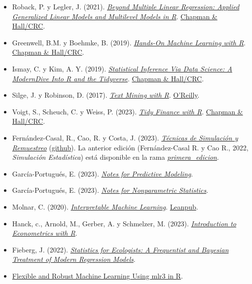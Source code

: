 \documentclass[
]{book}
\theoremstyle{break}
\theoremstyle{nonumberplain}
\begin{document}
\begin{itemize}
\item
  Roback, P. y Legler, J. (2021). \emph{\href{https://bookdown.org/roback/bookdown-BeyondMLR/}{Beyond Multiple Linear Regression: Applied Generalized Linear Models and Multilevel Models in R}}. \href{https://www.routledge.com/p/book/9781439885383}{Chapman \& Hall/CRC}.
\item
  Greenwell, B.M. y Boehmke, B. (2019). \emph{\href{https://bradleyboehmke.github.io/HOML/}{Hands-On Machine Learning with R}}. \href{https://www.crcpress.com/Hands-On-Machine-Learning-with-R/Boehmke-Greenwell/p/book/9781138495685}{Chapman \& Hall/CRC}.
\item
  Ismay, C. y Kim, A. Y. (2019). \emph{\href{https://moderndive.com/}{Statistical Inference Via Data Science: A ModernDive Into R and the Tidyverse}}. \href{https://www.routledge.com/p/book/9780367409821}{Chapman \& Hall/CRC}.
\item
  Silge, J. y Robinson, D. (2017). \emph{\href{https://www.tidytextmining.com/}{Text Mining with R}}. \href{https://www.oreilly.com/library/view/text-mining-with/9781491981641}{O'Reilly}.
\item
  Voigt, S., Scheuch, C. y Weiss, P. (2023). \emph{\href{https://www.tidy-finance.org/}{Tidy Finance with R}}. \href{https://www.routledge.com/p/book/9781032389349}{Chapman \& Hall/CRC}.
\end{itemize}

\begin{itemize}
\item
  Fernández-Casal, R., Cao, R. y Costa, J. (2023). \emph{\href{https://rubenfcasal.github.io/simbook}{Técnicas de Simulación y Remuestreo}} (\href{https://github.com/rubenfcasal/simbook}{github}). La anterior edición (Fernández-Casal R. y Cao R., 2022, \emph{Simulación Estadística}) está disponible en la rama \emph{\href{https://github.com/rubenfcasal/simbook/tree/primera_edicion}{primera\_edicion}}.
\item
  García-Portugués, E. (2023). \emph{\href{https://bookdown.org/egarpor/PM-UC3M/}{Notes for Predictive Modeling}}.
\item
  García-Portugués, E. (2023). \emph{\href{https://bookdown.org/egarpor/NP-UC3M/}{Notes for Nonparametric Statistics}}.
\item
  Molnar, C. (2020). \emph{\href{https://christophm.github.io/interpretable-ml-book}{Interpretable Machine Learning}}. \href{https://leanpub.com/interpretable-machine-learning}{Leanpub}.
\item
  Hanck, c., Arnold, M., Gerber, A. y Schmelzer, M. (2023). \emph{\href{https://www.econometrics-with-r.org/}{Introduction to Econometrics with R}}.
\item
  Fieberg, J. (2022). \emph{\href{https://fw8051statistics4ecologists.netlify.app/}{Statistics for Ecologists: A Frequentist and Bayesian Treatment of Modern Regression Models}}.
\item
  \href{https://mlr3book.mlr-org.com/}{Flexible and Robust Machine Learning Using mlr3 in R}.
\end{itemize}
\end{document}
